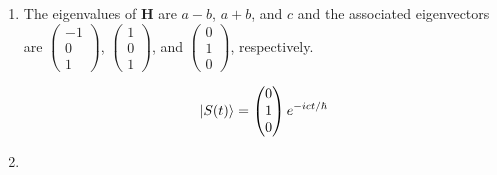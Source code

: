 \documentclass{article}
\renewcommand{\vec}[1]{\boldsymbol{\mathbf{#1}}}
\begin{document}
\subsection{}

\begin{enumerate}
  \item

        The eigenvalues of $\vec{H}$ are $a - b$, $a + b$, and $c$ and the associated eigenvectors are $\begin{pmatrix}
            -1 \\
            0  \\
            1
          \end{pmatrix}$, $\begin{pmatrix}
            1 \\
            0 \\
            1
          \end{pmatrix}$, and $\begin{pmatrix}
            0 \\
            1 \\
            0
          \end{pmatrix}$, respectively.

        \[\ket{S(t)} = \begin{pmatrix}
            0 \\
            1 \\
            0
          \end{pmatrix} e^{-i c t / \hbar}\]

  \item


\end{enumerate}
\end{document}
